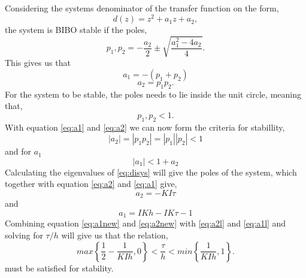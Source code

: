 \documentclass[12pt,a4paper]{article}
\begin{document}
\subsection{} %

Considering the systems denominator of the transfer function on the
form, 
\begin{equation}
    d(z) = z^2+a_1z+a_2,
\end{equation}
the system is BIBO stable if the poles,
\begin{equation}
  p_1,p_2=-\frac{a_2}{2}\pm \sqrt{\frac{a_1^2-4a_2}{4}}.
\end{equation}
This gives us that
\begin{equation}
    a_1=-(p_1+p_2)
    \label{eq:a1}
\end{equation}
\begin{equation}
    a_2=p_1p_2.
    \label{eq:a2}
\end{equation}
For the system to be stable, the poles needs to lie inside the unit
circle, meaning that,
\begin{equation}
    p_1, p_2 < 1.
\end{equation}
With equation \ref{eq:a1} and \ref{eq:a2} we can now form the criteria for stabillity,
\begin{equation}
    |a_2|=|p_1p_2|=|p_1||p_2|<1
    \label{eq:a2l}
\end{equation}
and for $a_1$
\begin{equation}
    |a_1|<1+a_2
    \label{eq:a1l}
\end{equation}
Calculating the eigenvalues of \ref{eq:disys} will give the poles of the
system, which together with equation \ref{eq:a2} and \ref{eq:a1} give,
\begin{equation}
  a_2 = -KI\tau
  \label{eq:a2new}
\end{equation}
and
\begin{equation}
    a_1 = IKh-IK\tau-1
    \label{eq:a1new}
\end{equation}
Combining equation \ref{eq:a1new} and \ref{eq:a2new} with \ref{eq:a2l}
and \ref{eq:a1l} and solving for $\tau/h$ will give us that the
relation,
\begin{equation}
  max\left\{\frac{1}{2}-\frac{1}{KIh},0\right\}<\frac{\tau}{h}<min\left\{\frac{1}{KIh},1\right\}.
\end{equation}
must be satisfied for stability.
\end{document}
